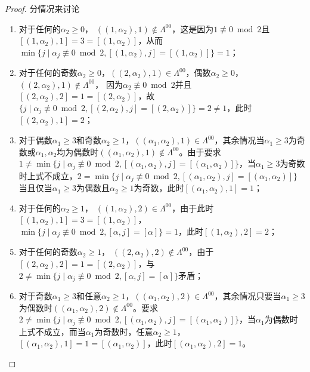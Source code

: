 \begin{proof}
分情况来讨论
\begin{enumerate}
	\item 对于任何的$\alpha_2\geq 0$， $((1,\alpha_2),1) \not \in \Lambda^{00}$，这是因为$1\not\equiv 0 \bmod 2$且$[(1,\alpha_2),1]=3=[(1,\alpha_2)]$，从而$\min\{j\mid \alpha_j\not\equiv 0 \bmod 2,[(1,\alpha_2),j]=[(1,\alpha_2)]\}=1$；
	\item 对于任何的奇数$\alpha_2\geq 0$，$((2,\alpha_2),1) \in \Lambda^{00}$，偶数$\alpha_2\geq 0$，$((2,\alpha_2),1) \not \in \Lambda^{00}$， 因为$\alpha_2\not\equiv 0 \bmod 2$并且$[(2,\alpha_2),2]=1=[(2,\alpha_2)]$，故$\{j\mid \alpha_j\not\equiv 0 \bmod 2,[(2,\alpha_2),j]=[(2,\alpha_2)]\}=2\neq 1$，此时$[(2,\alpha_2),1]=2$；
	\item 对于偶数$\alpha_1\geq 3$和奇数$\alpha_2\geq 1$，$((\alpha_1,\alpha_2),1)  \in \Lambda^{00}$，其余情况当$\alpha_1\geq 3$为奇数或$\alpha_1,\alpha_2$均为偶数时$((\alpha_1,\alpha_2),1) \not  \in \Lambda^{00}$。由于要求$1\neq \min\{j\mid \alpha_j\not\equiv 0 \bmod 2,[(\alpha_1,\alpha_2),j]=[(\alpha_1,\alpha_2)]\}$，当$\alpha_1\geq 3$为奇数时上式不成立，$2= \min\{j\mid \alpha_j\not\equiv 0 \bmod 2,[(\alpha_1,\alpha_2),j]=[(\alpha_1,\alpha_2)]\}$当且仅当$\alpha_1\geq 3$为偶数且$\alpha_2\geq 1$为奇数，此时$[(\alpha_1,\alpha_2),1]=1$；
	\item 对于任何的$\alpha_2\geq 1$， $((1,\alpha_2),2) \in \Lambda^{00}$，由于此时$[(1,\alpha_2),1]=3=[(1,\alpha_2)]$，$\min\{j\mid \alpha_j\not\equiv 0 \bmod 2,[\alpha,j]=[\alpha]\}=1$，此时$[(1,\alpha_2),2]=2$；
	\item 对于任何的奇数$\alpha_2\geq 1$， $((2,\alpha_2),2) \not \in \Lambda^{00}$，由于$[(2,\alpha_2),2]=1=[(2,\alpha_2)]$，与$2\neq \min\{j\mid \alpha_j\not\equiv 0 \bmod 2,[\alpha,j]=[\alpha]\}$矛盾；
	\item 对于奇数$\alpha_1\geq 3$和任意$\alpha_2\geq 1 $，$((\alpha_1,\alpha_2),2)  \in \Lambda^{00}$，其余情况只要当$\alpha_1\geq 3$为偶数时$((\alpha_1,\alpha_2),2) \not  \in \Lambda^{00}$。要求$2\neq \min\{j\mid \alpha_j\not\equiv 0 \bmod 2,[(\alpha_1,\alpha_2),j]=[(\alpha_1,\alpha_2)]\}$，当$\alpha_1$为偶数时上式不成立，而当$\alpha_1$为奇数时，任意$\alpha_2\geq 1$，$[(\alpha_1,\alpha_2),1]=1=[(\alpha_1,\alpha_2)]$，此时$[(\alpha_1,\alpha_2),2]=1$。
\end{enumerate}




\end{proof}
